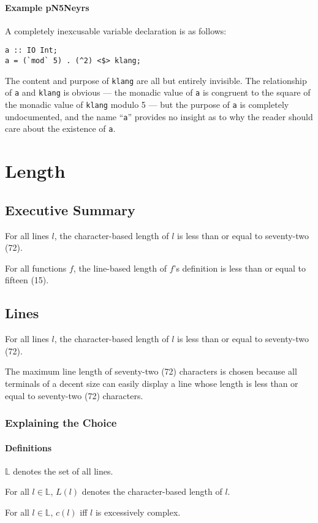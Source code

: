 \documentclass{report}
\begin{document}
\subsubsection{Example pN5Neyrs}
A completely inexcusable variable declaration is as follows:
\begin{lstlisting}
a :: IO Int;
a = (`mod` 5) . (^2) <$> klang;
\end{lstlisting}
The content and purpose of \texttt{klang} are all but entirely invisible.  The relationship of \texttt{a} and \texttt{klang} is obvious --- the monadic value of \texttt{a} is congruent to the square of the monadic value of \texttt{klang} modulo 5 --- but the purpose of \texttt{a} is completely undocumented, and the name ``\texttt{a}'' provides no insight as to why the reader should care about the existence of \texttt{a}.
\chapter{Length}
\section{Executive Summary}
For all lines $l$, the character-based length of $l$ is less than or equal to seventy-two (72).

For all functions $f$, the line-based length of $f$'s definition is less than or equal to fifteen (15).
\section{Lines}
For all lines $l$, the character-based length of $l$ is less than or equal to seventy-two (72).

The maximum line length of seventy-two (72) characters is chosen because all terminals of a decent size can easily display a line whose length is less than or equal to seventy-two (72) characters.
\subsection{Explaining the Choice}
\subsubsection{Definitions}
$\mathbb L$ denotes the set of all lines.

For all $l \in \mathbb L$, $L(l)$ denotes the character-based length of $l$.

For all $l \in \mathbb L$, $c(l)$ iff $l$ is excessively complex.
\end{document}
